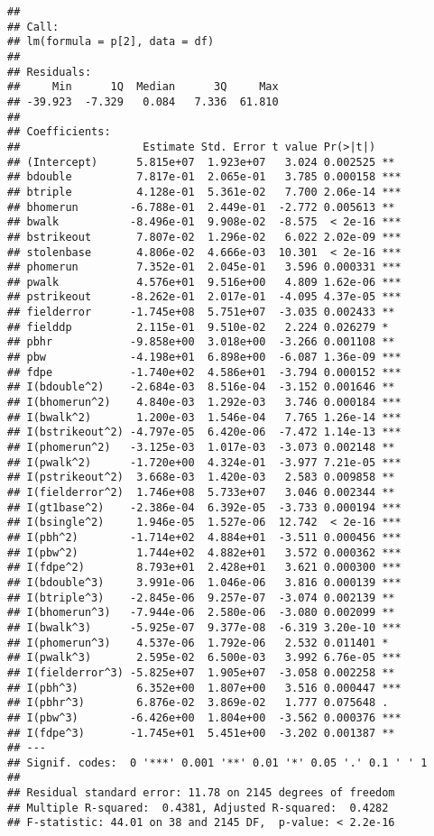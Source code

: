 \documentclass[
]{article}
\begin{document}
\begin{verbatim}
## 
## Call:
## lm(formula = p[2], data = df)
## 
## Residuals:
##     Min      1Q  Median      3Q     Max 
## -39.923  -7.329   0.084   7.336  61.810 
## 
## Coefficients:
##                   Estimate Std. Error t value Pr(>|t|)    
## (Intercept)      5.815e+07  1.923e+07   3.024 0.002525 ** 
## bdouble          7.817e-01  2.065e-01   3.785 0.000158 ***
## btriple          4.128e-01  5.361e-02   7.700 2.06e-14 ***
## bhomerun        -6.788e-01  2.449e-01  -2.772 0.005613 ** 
## bwalk           -8.496e-01  9.908e-02  -8.575  < 2e-16 ***
## bstrikeout       7.807e-02  1.296e-02   6.022 2.02e-09 ***
## stolenbase       4.806e-02  4.666e-03  10.301  < 2e-16 ***
## phomerun         7.352e-01  2.045e-01   3.596 0.000331 ***
## pwalk            4.576e+01  9.516e+00   4.809 1.62e-06 ***
## pstrikeout      -8.262e-01  2.017e-01  -4.095 4.37e-05 ***
## fielderror      -1.745e+08  5.751e+07  -3.035 0.002433 ** 
## fielddp          2.115e-01  9.510e-02   2.224 0.026279 *  
## pbhr            -9.858e+00  3.018e+00  -3.266 0.001108 ** 
## pbw             -4.198e+01  6.898e+00  -6.087 1.36e-09 ***
## fdpe            -1.740e+02  4.586e+01  -3.794 0.000152 ***
## I(bdouble^2)    -2.684e-03  8.516e-04  -3.152 0.001646 ** 
## I(bhomerun^2)    4.840e-03  1.292e-03   3.746 0.000184 ***
## I(bwalk^2)       1.200e-03  1.546e-04   7.765 1.26e-14 ***
## I(bstrikeout^2) -4.797e-05  6.420e-06  -7.472 1.14e-13 ***
## I(phomerun^2)   -3.125e-03  1.017e-03  -3.073 0.002148 ** 
## I(pwalk^2)      -1.720e+00  4.324e-01  -3.977 7.21e-05 ***
## I(pstrikeout^2)  3.668e-03  1.420e-03   2.583 0.009858 ** 
## I(fielderror^2)  1.746e+08  5.733e+07   3.046 0.002344 ** 
## I(gt1base^2)    -2.386e-04  6.392e-05  -3.733 0.000194 ***
## I(bsingle^2)     1.946e-05  1.527e-06  12.742  < 2e-16 ***
## I(pbh^2)        -1.714e+02  4.884e+01  -3.511 0.000456 ***
## I(pbw^2)         1.744e+02  4.882e+01   3.572 0.000362 ***
## I(fdpe^2)        8.793e+01  2.428e+01   3.621 0.000300 ***
## I(bdouble^3)     3.991e-06  1.046e-06   3.816 0.000139 ***
## I(btriple^3)    -2.845e-06  9.257e-07  -3.074 0.002139 ** 
## I(bhomerun^3)   -7.944e-06  2.580e-06  -3.080 0.002099 ** 
## I(bwalk^3)      -5.925e-07  9.377e-08  -6.319 3.20e-10 ***
## I(phomerun^3)    4.537e-06  1.792e-06   2.532 0.011401 *  
## I(pwalk^3)       2.595e-02  6.500e-03   3.992 6.76e-05 ***
## I(fielderror^3) -5.825e+07  1.905e+07  -3.058 0.002258 ** 
## I(pbh^3)         6.352e+00  1.807e+00   3.516 0.000447 ***
## I(pbhr^3)        6.876e-02  3.869e-02   1.777 0.075648 .  
## I(pbw^3)        -6.426e+00  1.804e+00  -3.562 0.000376 ***
## I(fdpe^3)       -1.745e+01  5.451e+00  -3.202 0.001387 ** 
## ---
## Signif. codes:  0 '***' 0.001 '**' 0.01 '*' 0.05 '.' 0.1 ' ' 1
## 
## Residual standard error: 11.78 on 2145 degrees of freedom
## Multiple R-squared:  0.4381, Adjusted R-squared:  0.4282 
## F-statistic: 44.01 on 38 and 2145 DF,  p-value: < 2.2e-16
\end{verbatim}
\end{document}
